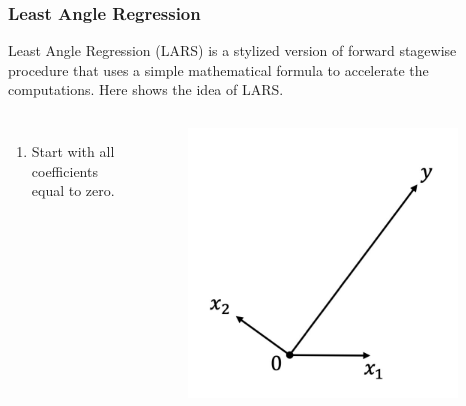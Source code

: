 \begin{frame}
\frametitle{Least Angle Regression}
Least Angle Regression (LARS) is a stylized version of forward stagewise procedure that uses a simple mathematical formula to accelerate the computations. Here shows the idea of LARS.

\begin{columns}
    \begin{enumerate}
        \item Start with all coefficients equal to zero.
    \end{enumerate}
    
    \begin{figure}[!htbp]
        \begin{center}
            \includegraphics[width=0.95\textwidth]{img/LAR/1.jpeg}
        \end{center}
    \end{figure}
\end{columns}
\end{frame}

